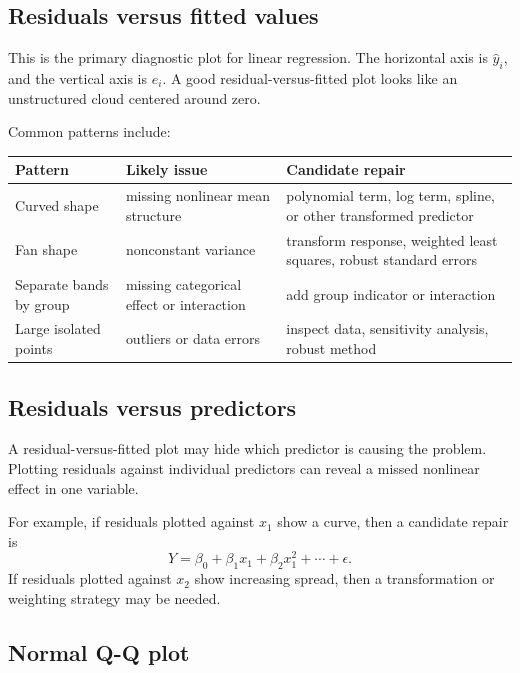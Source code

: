 \subsection{Residuals versus fitted values}

This is the primary diagnostic plot for linear regression.  The horizontal axis is \(\widehat{y}_i\), and the vertical axis is \(e_i\).  A good residual-versus-fitted plot looks like an unstructured cloud centered around zero.

Common patterns include:
\begin{center}
\begin{tabular}{p{}p{}p{}}
\toprule
Pattern & Likely issue & Candidate repair \\
\midrule
Curved shape & missing nonlinear mean structure & polynomial term, log term, spline, or other transformed predictor \\
Fan shape & nonconstant variance & transform response, weighted least squares, robust standard errors \\
Separate bands by group & missing categorical effect or interaction & add group indicator or interaction \\
Large isolated points & outliers or data errors & inspect data, sensitivity analysis, robust method \\
\bottomrule
\end{tabular}
\end{center}

\subsection{Residuals versus predictors}

A residual-versus-fitted plot may hide which predictor is causing the problem.  Plotting residuals against individual predictors can reveal a missed nonlinear effect in one variable.

For example, if residuals plotted against \(x_1\) show a curve, then a candidate repair is
\begin{equation}
  Y=\beta_0+\beta_1x_1+\beta_2x_1^2+\cdots+\epsilon.
\end{equation}
If residuals plotted against \(x_2\) show increasing spread, then a transformation or weighting strategy may be needed.

\subsection{Normal Q-Q plot}

